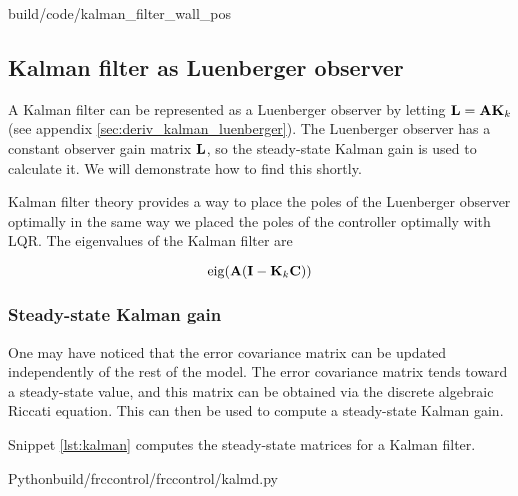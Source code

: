 \begin{svg}{build/code/kalman_filter_wall_pos}
  \caption{Wall position estimate and variance with Kalman filter}
  \label{fig:filter_wall_pos}
\end{svg}

\subsection{Kalman filter as Luenberger observer}

A Kalman filter can be represented as a Luenberger \gls{observer} by letting
$\mathbf{L} = \mathbf{A} \mathbf{K}_k$ (see appendix \ref{sec:deriv_kalman_luenberger}).
The Luenberger observer has a constant observer gain matrix $\mathbf{L}$, so the
steady-state Kalman gain is used to calculate it. We will demonstrate how to
find this shortly.

Kalman filter theory provides a way to place the poles of the Luenberger
observer optimally in the same way we placed the poles of the controller
optimally with LQR. The eigenvalues of the Kalman filter are

\begin{equation}
  \operatorname{eig}(\mathbf{A}(\mathbf{I} - \mathbf{K}_k\mathbf{C}))
\end{equation}

\subsubsection{Steady-state Kalman gain}

One may have noticed that the error covariance matrix can be updated
independently of the rest of the \gls{model}. The error covariance matrix tends
toward a steady-state value, and this matrix can be obtained via the discrete
algebraic Riccati equation. This can then be used to compute a steady-state
Kalman gain.

Snippet \ref{lst:kalman} computes the steady-state matrices for a Kalman
filter.

\begin{code}{Python}{build/frccontrol/frccontrol/kalmd.py}
  \caption{Steady-state Kalman gain and error covariance matrices calculation in
    Python}
  \label{lst:kalman}
\end{code}
